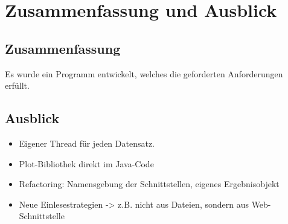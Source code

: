 \chapter{Zusammenfassung und Ausblick}\label{ch:zusammenfassung-und-ausblick}

\section{Zusammenfassung}\label{sec:zusammenfassung}
Es wurde ein Programm entwickelt, welches die geforderten Anforderungen erfüllt.

\section{Ausblick}\label{sec:ausblick}
\begin{itemize}
    \item Eigener Thread für jeden Datensatz.
    \item Plot-Bibliothek direkt im Java-Code
    \item Refactoring: Namensgebung der Schnittstellen, eigenes Ergebnisobjekt
    \item Neue Einlesestrategien -> z.B. nicht aus Dateien, sondern aus Web-Schnittstelle
\end{itemize}